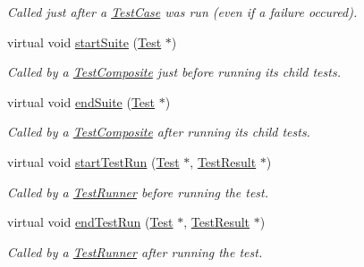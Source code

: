 \begin{DoxyCompactItemize}
\begin{DoxyCompactList}\small\item\em Called just after a \hyperlink{class_test_case}{Test\+Case} was run (even if a failure occured). \end{DoxyCompactList}\item 
\hypertarget{class_test_listener_a2360ebfccfa39f75bdc43948d5d1d2e7}{virtual void \hyperlink{class_test_listener_a2360ebfccfa39f75bdc43948d5d1d2e7}{start\+Suite} (\hyperlink{class_test}{Test} $\ast$)}\label{class_test_listener_a2360ebfccfa39f75bdc43948d5d1d2e7}

\begin{DoxyCompactList}\small\item\em Called by a \hyperlink{class_test_composite}{Test\+Composite} just before running its child tests. \end{DoxyCompactList}\item 
\hypertarget{class_test_listener_ad49e5589681732a1faff8fca5cbe61f5}{virtual void \hyperlink{class_test_listener_ad49e5589681732a1faff8fca5cbe61f5}{end\+Suite} (\hyperlink{class_test}{Test} $\ast$)}\label{class_test_listener_ad49e5589681732a1faff8fca5cbe61f5}

\begin{DoxyCompactList}\small\item\em Called by a \hyperlink{class_test_composite}{Test\+Composite} after running its child tests. \end{DoxyCompactList}\item 
virtual void \hyperlink{class_test_listener_a263428abdf29b2a7123af4096771925e}{start\+Test\+Run} (\hyperlink{class_test}{Test} $\ast$, \hyperlink{class_test_result}{Test\+Result} $\ast$)
\begin{DoxyCompactList}\small\item\em Called by a \hyperlink{class_test_runner}{Test\+Runner} before running the test. \end{DoxyCompactList}\item 
virtual void \hyperlink{class_test_listener_a0411708032f688f6ec234bcc5e089289}{end\+Test\+Run} (\hyperlink{class_test}{Test} $\ast$, \hyperlink{class_test_result}{Test\+Result} $\ast$)
\begin{DoxyCompactList}\small\item\em Called by a \hyperlink{class_test_runner}{Test\+Runner} after running the test. \end{DoxyCompactList}\end{DoxyCompactItemize}


